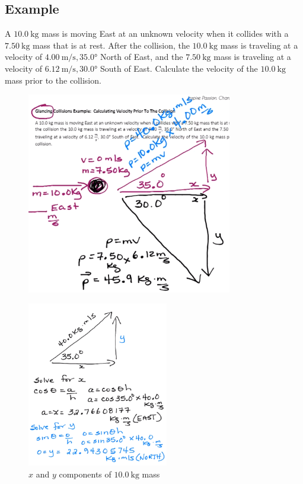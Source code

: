\documentclass[a4paper,12pt]{article}
\begin{document}
\subsection{Example}
A $\SI{10.0}{\kg}$ mass is moving East at an unknown velocity when it collides with a $\SI{7.50}{\kg}$ mass that is at rest. After the collision, the $\SI{10.0}{\kg}$ mass is traveling at a velocity of $\SI{4.00}{\m\per\s}, \ang{35.0}$ North of East, and the $\SI{7.50}{\kg}$ mass is traveling at a velocity of $\SI{6.12}{\m\per\s}, \ang{30.0}$ South of East. Calculate the velocity of the $\SI{10.0}{\kg}$ mass prior to the collision.

\begin{figure}[H]
    \centering
    \includegraphics[width=0.8\textwidth]{q-glance-1a}
\end{figure}
\begin{figure}[H]
    \centering
    \caption{$x$ and $y$ components of $\SI{10.0}{\kg}$ mass}
    \includegraphics[width=0.55\textwidth]{q-glance-1b}
\end{figure}
\end{document}
